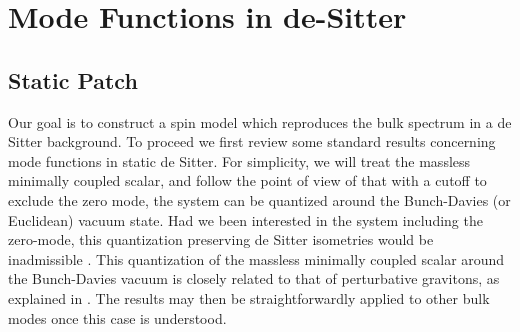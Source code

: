 \documentclass{brownthesis}
\begin{document}
\section{Mode Functions in de-Sitter}

\subsection{Static Patch}

Our goal is to construct a spin model which reproduces the bulk spectrum
in a de Sitter background. To proceed we first review some standard
results concerning mode functions in static de Sitter. For simplicity,
we will treat the massless minimally coupled scalar, and follow the
point of view of \cite{Danielsson:2002qh} that with a cutoff to
exclude the zero mode, the system can be quantized around the Bunch-Davies
(or Euclidean) vacuum state. Had we been interested in the system
including the zero-mode, this quantization preserving de Sitter isometries
would be inadmissible \cite{Allen:1987tz}. This quantization of
the massless minimally coupled scalar around the Bunch-Davies vacuum
is closely related to that of perturbative gravitons, as explained
in \cite{Bernar:2016zgq,Bernar:2018nww}. The results may then be
straightforwardly applied to other bulk modes once this case is understood.
\end{document}
